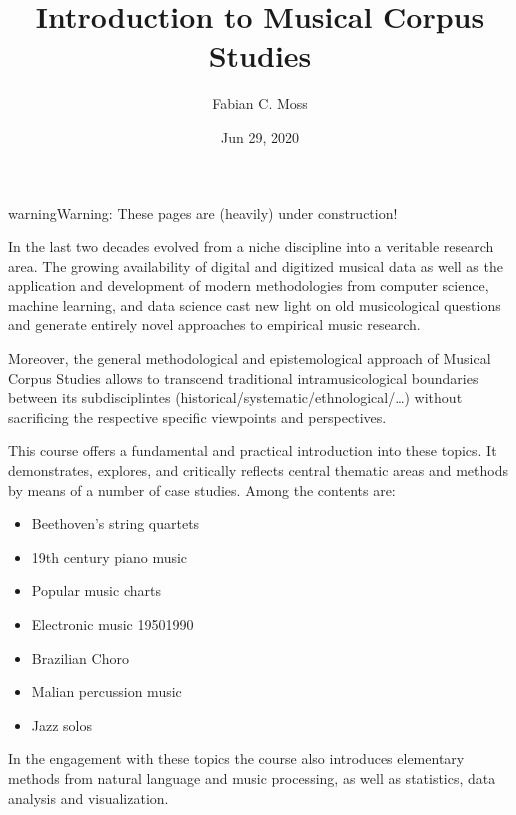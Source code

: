 \documentclass[letterpaper,10pt,english]{sphinxmanual}
\title{Introduction to Musical Corpus Studies}
\date{Jun 29, 2020}
\author{Fabian C.\@{} Moss}
\begin{document}
\pagestyle{empty}
\sphinxmaketitle
\pagestyle{plain}
\sphinxtableofcontents
\pagestyle{normal}
\label{\detokenize{index::doc}}


\begin{sphinxadmonition}{warning}{Warning:}
These pages are (heavily) under construction!
\end{sphinxadmonition}

In the last two decades  evolved from a niche discipline into a veritable research area.
The growing availability of digital and digitized musical data as well as the application and development of modern
methodologies from computer science, machine learning, and data science cast new light on old musicological questions
and generate entirely novel approaches to empirical music research.

Moreover, the general methodological and epistemological approach of Musical Corpus Studies allows to transcend traditional
intra\sphinxhyphen{}musicological boundaries between its sub\sphinxhyphen{}disciplintes (historical/systematic/ethnological/…) without sacrificing the
respective specific viewpoints and perspectives.

This course offers a fundamental and practical introduction into these topics.
It demonstrates, explores, and critically reflects central thematic areas and methods by means of a number of case studies.
Among the contents are:
\begin{itemize}
\item {} 
Beethoven’s string quartets

\item {} 
19th century piano music

\item {} 
Popular music charts

\item {} 
Electronic music 1950\sphinxhyphen{}1990

\item {} 
Brazilian Choro

\item {} 
Malian percussion music

\item {} 
Jazz solos

\end{itemize}

In the engagement with these topics the course also introduces elementary methods from natural language and music processing,
as well as statistics, data analysis and visualization.
\end{document}
